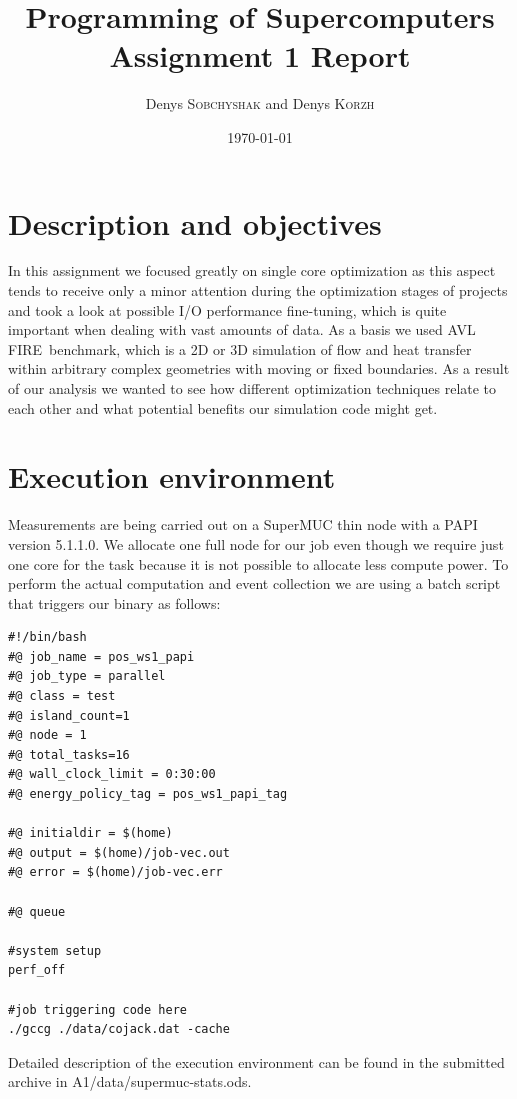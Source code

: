 \documentclass{article}
\title{Programming of Supercomputers \\ Assignment 1 Report} %
\author{Denys \textsc{Sobchyshak} and Denys \textsc{Korzh}} %
\date{\today} %
\begin{document}
\maketitle %

\section{Description and objectives}
In this assignment we focused greatly on single core optimization as this aspect tends to receive only a minor attention during the optimization stages of projects and took a look at possible I/O performance fine-tuning, which is quite important when dealing with vast amounts of data. As a basis we used AVL FIRE\textregistered\ benchmark, which is a 2D or 3D simulation of flow and heat transfer within arbitrary complex geometries with moving or fixed boundaries. As a result of our analysis we wanted to see how different optimization techniques relate to each other and what potential benefits our simulation code might get.

\section{Execution environment}
Measurements are being carried out on a SuperMUC thin node with a PAPI version 5.1.1.0. We allocate one full node for our job even though we require just one core for the task because it is not possible to allocate less compute power. To perform the actual computation and event collection we are using a batch script that triggers our binary as follows:

\begin{lstlisting}[frame=single]
#!/bin/bash
#@ job_name = pos_ws1_papi
#@ job_type = parallel
#@ class = test
#@ island_count=1
#@ node = 1
#@ total_tasks=16
#@ wall_clock_limit = 0:30:00
#@ energy_policy_tag = pos_ws1_papi_tag

#@ initialdir = $(home)
#@ output = $(home)/job-vec.out
#@ error = $(home)/job-vec.err

#@ queue

#system setup
perf_off

#job triggering code here
./gccg ./data/cojack.dat -cache
\end{lstlisting}
Detailed description of the execution environment can be found in the submitted archive in A1/data/supermuc-stats.ods.
 
\end{document}
